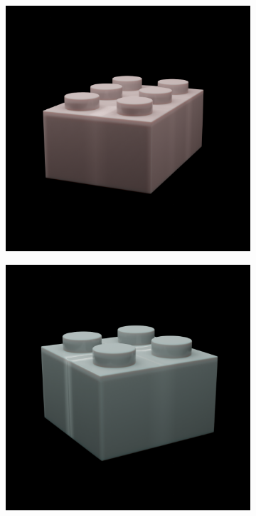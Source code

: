 \documentclass[]{article}
\begin{document}
\begin{figure}[h]
\begin{subfigure}[b]{0.2\textwidth}
    \end{subfigure}
    \begin{subfigure}[b]{0.2\textwidth}
        \includegraphics[width=\textwidth]{generated images/37.png}
    \end{subfigure}
    \begin{subfigure}[b]{0.2\textwidth}
        \includegraphics[width=\textwidth]{generated images/38.png}

\end{subfigure}
\end{figure}
\end{document}
